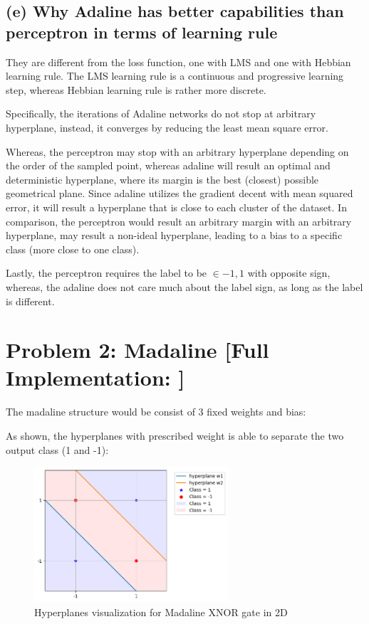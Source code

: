 \documentclass{tron}
\begin{document}
\newpage
\subsection{(e) Why Adaline has better capabilities than perceptron in terms of learning rule}

They are different from the loss function, one with LMS and one with Hebbian learning rule. The LMS learning rule is a continuous and progressive learning step, whereas Hebbian learning rule is rather more discrete.

Specifically, the iterations of Adaline networks do not stop at arbitrary hyperplane, instead, it converges by reducing the least mean square error.

Whereas, the perceptron may stop with an arbitrary hyperplane depending on the order of the sampled point, whereas adaline will result an optimal and deterministic hyperplane, where its margin is the best (closest) possible geometrical plane. Since adaline utilizes the gradient decent with mean squared error, it will result a hyperplane that is close to each cluster of the dataset. In comparison, the perceptron would result an arbitrary margin with an arbitrary hyperplane, may result a non-ideal hyperplane, leading to a bias to a specific class (more close to one class).

Lastly, the perceptron requires the label to be $\in {-1, 1}$ with opposite sign, whereas, the adaline does not care much about the label sign, as long as the label is different.


\newpage
\section{Problem 2: Madaline [Full Implementation: ]}
The madaline structure would be consist of 3 fixed weights and bias:
	

As  shown, the hyperplanes with prescribed weight is able to separate the two output class (1 and -1):
\begin{figure}[H]
	\centering
	\includegraphics[height=190px]{../src_code/fig/madaline}
	\caption{Hyperplanes visualization for Madaline XNOR gate in 2D \label{fig:q2:madaline}}
\end{figure}
\end{document}
